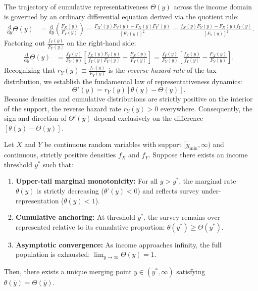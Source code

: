 The trajectory of cumulative representativeness $\Theta(y)$ across the income domain is governed by an ordinary differential equation derived via the quotient rule:
\begin{align*}
    \frac{\mathrm{d}}{\mathrm{d}y}\Theta(y) &= \frac{\mathrm{d}}{\mathrm{d}y}\left( \frac{F_X(y)}{F_Y(y)} \right) = \frac{F_X'(y)F_Y(y) - F_X(y)F_Y'(y)}{[F_Y(y)]^2} = \frac{f_X(y)F_Y(y) - F_X(y)f_Y(y)}{[F_Y(y)]^2}.
\end{align*}
Factoring out $\frac{f_Y(y)}{F_Y(y)}$ on the right-hand side:
\begin{align*}
    \frac{\mathrm{d}}{\mathrm{d}y}\Theta(y) &= \frac{f_Y(y)}{F_Y(y)} \left[ \frac{f_X(y)F_Y(y)}{f_Y(y)F_Y(y)} - \frac{F_X(y)}{F_Y(y)} \right] = \frac{f_Y(y)}{F_Y(y)} \left[ \frac{f_X(y)}{f_Y(y)} - \frac{F_X(y)}{F_Y(y)} \right].
\end{align*}
Recognizing that $r_Y(y) \equiv \frac{f_Y(y)}{F_Y(y)}$ is the \textit{reverse hazard rate} of the tax distribution, we establish the fundamental law of representativeness dynamics:
\begin{equation}
    \Theta'(y) = r_Y(y) \left[ \theta(y) - \Theta(y) \right].
    \label{eq:representativeness_ode}
\end{equation}
Because densities and cumulative distributions are strictly positive on the interior of the support, the reverse hazard rate $r_Y(y) > 0$ everywhere. Consequently, the sign and direction of $\Theta'(y)$ depend exclusively on the difference $[\theta(y) - \Theta(y)]$.

\begin{proposition}
Let $X$ and $Y$ be continuous random variables with support $[y_{\min}, \infty)$ and continuous, strictly positive densities $f_X$ and $f_Y$. Suppose there exists an income threshold $y^*$ such that:
\begin{enumerate}
    \item \textbf{Upper-tail marginal monotonicity:} For all $y > y^*$, the marginal rate $\theta(y)$ is strictly decreasing ($\theta'(y) < 0$) and reflects survey under-representation ($\theta(y) < 1$).
    \item \textbf{Cumulative anchoring:} At threshold $y^*$, the survey remains over-represented relative to its cumulative proportion: $\theta(y^*) \ge \Theta(y^*)$.
    \item \textbf{Asymptotic convergence:} As income approaches infinity, the full population is exhausted: $\lim_{y \to \infty} \Theta(y) = 1$.
\end{enumerate}
Then, there exists a unique merging point $\bar{y} \in (y^*, \infty)$ satisfying $\theta(\bar{y}) = \Theta(\bar{y})$.
\end{proposition}

